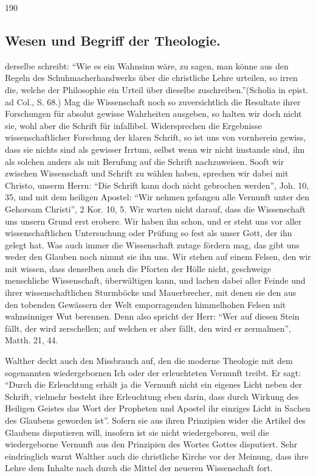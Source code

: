190

\subsection*{Wesen und Begriff der Theologie.}

derselbe schreibt: \textquotedblleft Wie es ein Wahnsinn wäre, zu sagen, man könne aus den Regeln des Schuhmacherhandwerks über die christliche Lehre urteilen, so irren die, welche der Philosophie ein Urteil über dieselbe zuschreiben.\textquotedblright (Scholia in epist. ad Col., S. 68.) Mag die Wissenschaft noch so zuversichtlich die Resultate ihrer Forschungen für absolut gewisse Wahrheiten ausgeben, so halten wir doch nicht sie, wohl aber die Schrift für infallibel. Widersprechen die Ergebnisse wissenschaftlicher Forschung der klaren Schrift, so ist uns von vornherein gewiss, dass sie nichts sind als gewisser Irrtum, selbst wenn wir nicht imstande sind, ihn als solchen anders als mit Berufung auf die Schrift nachzuweisen. Sooft wir zwischen Wissenschaft und Schrift zu wählen haben, sprechen wir dabei mit Christo, unserm Herrn: \textquotedblleft Die Schrift kann doch nicht gebrochen werden\textquotedblright, Joh. 10, 35, und mit dem heiligen Apostel: \textquotedblleft Wir nehmen gefangen alle Vernunft unter den Gehorsam Christi\textquotedblright, 2 Kor. 10, 5. Wir warten nicht darauf, dass die Wissenschaft uns unsern Grund erst erobere. Wir haben ihn schon, und er steht uns vor aller wissenschaftlichen Untersuchung oder Prüfung so fest als unser Gott, der ihn gelegt hat. Was auch immer die Wissenschaft zutage fördern mag, das gibt uns weder den Glauben noch nimmt sie ihn uns. Wir stehen auf einem Felsen, den wir mit wissen, dass denselben auch die Pforten der Hölle nicht, geschweige menschliche Wissenschaft, überwältigen kann, und lachen dabei aller Feinde und ihrer wissenschaftlichen Sturmböcke und Mauerbrecher, mit denen sie den aus den tobenden Gewässern der Welt emporragenden himmelhohen Felsen mit wahnsinniger Wut berennen. Denn also spricht der Herr: \textquotedblleft Wer auf diesen Stein fällt, der wird zerschellen; auf welchen er aber fällt, den wird er zermalmen\textquotedblright, Matth. 21, 44.

Walther deckt auch den Missbrauch auf, den die moderne Theologie mit dem sogenannten wiedergebornen Ich oder der erleuchteten Vernunft treibt. Er sagt: \textquotedblleft Durch die Erleuchtung erhält ja die Vernunft nicht ein eigenes Licht neben der Schrift, vielmehr besteht ihre Erleuchtung eben darin, dass durch Wirkung des Heiligen Geistes das Wort der Propheten und Apostel ihr einziges Licht in Sachen des Glaubens geworden ist\textquotedblright. Sofern sie aus ihren Prinzipien wider die Artikel des Glaubens disputieren will, insofern ist sie nicht wiedergeboren, weil die wiedergeborne Vernunft aus den Prinzipien des Wortes Gottes disputiert. Sehr eindringlich warnt Walther auch die christliche Kirche vor der Meinung, dass ihre Lehre dem Inhalte nach durch die Mittel der neueren Wissenschaft fort.